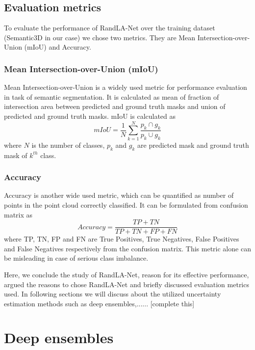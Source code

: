 \subsection{Evaluation metrics}
To evaluate the performance of RandLA-Net over the training dataset (Semantic3D in our case) we chose two metrics.
They are Mean Intersection-over-Union (mIoU) and Accuracy.

\subsubsection{Mean Intersection-over-Union (mIoU)}
Mean Intersection-over-Union is a widely used metric for performance evaluation in task of semantic segmentation.
It is calculated as mean of fraction of intersection area between predicted and ground truth masks and union of predicted and ground truth masks.
mIoU is calculated as
$$mIoU=\frac{1}{N}\sum_{k=1}^N \frac{p_k\cap g_k}{p_k \cup g_k}$$
where $N$ is the number of classes, $p_k$ and $g_k$ are predicted mask and ground truth mask of $k^{th}$ class.

\subsubsection{Accuracy}
Accuracy is another wide used metric, which can be quantified as number of points in the point cloud correctly classified.
It can be formulated from confusion matrix as
$$Accuracy = \frac{TP+TN}{TP+TN+FP+FN}$$
where TP, TN, FP and FN are True Positives, True Negatives, False Positives and False Negatives respectively from the confusion matrix.
This metric alone can be misleading in case of serious class imbalance.

Here, we conclude the study of RandLA-Net, reason for its effective performance, argued the reasons to chose RandLA-Net and briefly discussed evaluation metrics used.
In following sections we will discuss about the utilized uncertainty estimation methods such as deep ensembles,...... [complete this]

\section{Deep ensembles}


